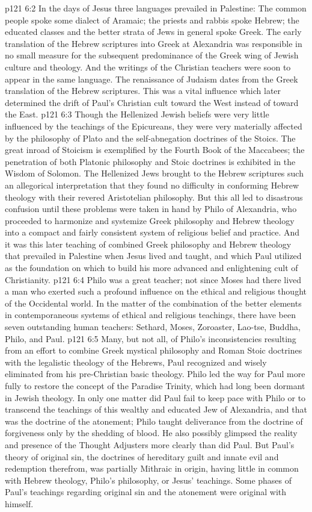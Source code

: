 \vs p121 6:2 In the days of Jesus three languages prevailed in Palestine: The common people spoke some dialect of Aramaic; the priests and rabbis spoke Hebrew; the educated classes and the better strata of Jews in general spoke Greek. The early translation of the Hebrew scriptures into Greek at Alexandria was responsible in no small measure for the subsequent predominance of the Greek wing of Jewish culture and theology. And the writings of the Christian teachers were soon to appear in the same language. The renaissance of Judaism dates from the Greek translation of the Hebrew scriptures. This was a vital influence which later determined the drift of Paul’s Christian cult toward the West instead of toward the East.
\vs p121 6:3 Though the Hellenized Jewish beliefs were very little influenced by the teachings of the Epicureans, they were very materially affected by the philosophy of Plato and the self\hyp{}abnegation doctrines of the Stoics. The great inroad of Stoicism is exemplified by the Fourth Book of the Maccabees; the penetration of both Platonic philosophy and Stoic doctrines is exhibited in the Wisdom of Solomon. The Hellenized Jews brought to the Hebrew scriptures such an allegorical interpretation that they found no difficulty in conforming Hebrew theology with their revered Aristotelian philosophy. But this all led to disastrous confusion until these problems were taken in hand by Philo of Alexandria, who proceeded to harmonize and systemize Greek philosophy and Hebrew theology into a compact and fairly consistent system of religious belief and practice. And it was this later teaching of combined Greek philosophy and Hebrew theology that prevailed in Palestine when Jesus lived and taught, and which Paul utilized as the foundation on which to build his more advanced and enlightening cult of Christianity.
\vs p121 6:4 Philo was a great teacher; not since Moses had there lived a man who exerted such a profound influence on the ethical and religious thought of the Occidental world. In the matter of the combination of the better elements in contemporaneous systems of ethical and religious teachings, there have been seven outstanding human teachers: Sethard, Moses, Zoroaster, Lao\hyp{}tse, Buddha, Philo, and Paul.
\vs p121 6:5 Many, but not all, of Philo’s inconsistencies resulting from an effort to combine Greek mystical philosophy and Roman Stoic doctrines with the legalistic theology of the Hebrews, Paul recognized and wisely eliminated from his pre\hyp{}Christian basic theology. Philo led the way for Paul more fully to restore the concept of the Paradise Trinity, which had long been dormant in Jewish theology. In only one matter did Paul fail to keep pace with Philo or to transcend the teachings of this wealthy and educated Jew of Alexandria, and that was the doctrine of the atonement; Philo taught deliverance from the doctrine of forgiveness only by the shedding of blood. He also possibly glimpsed the reality and presence of the Thought Adjusters more clearly than did Paul. But Paul’s theory of original sin, the doctrines of hereditary guilt and innate evil and redemption therefrom, was partially Mithraic in origin, having little in common with Hebrew theology, Philo’s philosophy, or Jesus’ teachings. Some phases of Paul’s teachings regarding original sin and the atonement were original with himself.
